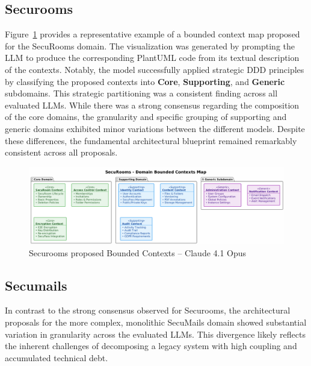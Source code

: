 \subsection{Securooms}
Figure~\ref{fig:diagram-bounded-contexts-secumail-claude} provides a representative example of a bounded context map proposed for the SecuRooms domain. The visualization was generated by prompting the LLM to produce the corresponding PlantUML code from its textual description of the contexts. Notably, the model successfully applied strategic DDD principles by classifying the proposed contexts into \textbf{Core}, \textbf{Supporting}, and \textbf{Generic} subdomains. This strategic partitioning was a consistent finding across all evaluated LLMs. While there was a strong consensus regarding the composition of the core domains, the granularity and specific grouping of supporting and generic domains exhibited minor variations between the different models. Despite these differences, the fundamental architectural blueprint remained remarkably consistent across all proposals.

\begin{figure}[htbp]
  \centering
  \begin{adjustbox}{max width=\textwidth}
      \includegraphics{figures/bounded-context-securoom-claude.png} 
  \end{adjustbox}
  \caption{Securooms proposed Bounded Contexts – Claude 4.1 Opus}
  \label{fig:diagram-bounded-contexts-secumail-claude} 
\end{figure}

\subsection{Secumails}
In contrast to the strong consensus observed for Securooms, the architectural proposals for the more complex, monolithic SecuMails domain showed substantial variation in granularity across the evaluated LLMs. This divergence likely reflects the inherent challenges of decomposing a legacy system with high coupling and accumulated technical debt.

